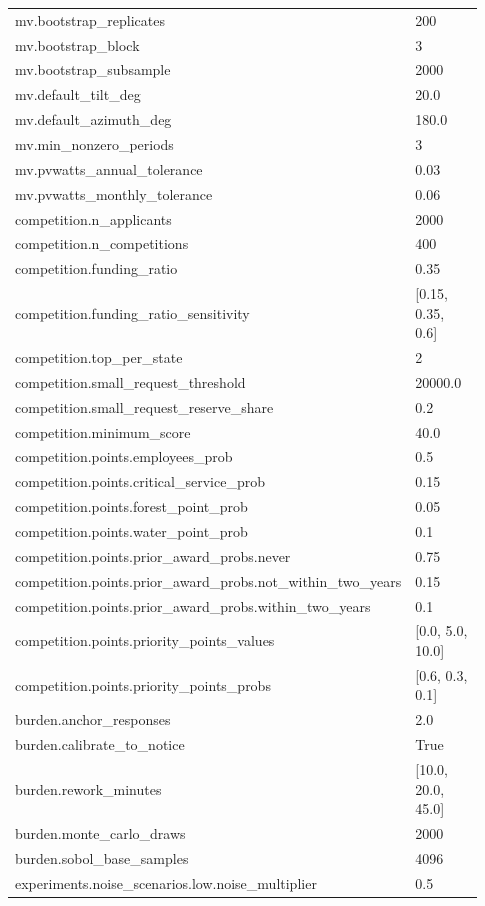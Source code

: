 \begin{longtable}{p{0.55\linewidth}p{0.38\linewidth}}
mv.bootstrap\_replicates & 200 \\
mv.bootstrap\_block & 3 \\
mv.bootstrap\_subsample & 2000 \\
mv.default\_tilt\_deg & 20.0 \\
mv.default\_azimuth\_deg & 180.0 \\
mv.min\_nonzero\_periods & 3 \\
mv.pvwatts\_annual\_tolerance & 0.03 \\
mv.pvwatts\_monthly\_tolerance & 0.06 \\
competition.n\_applicants & 2000 \\
competition.n\_competitions & 400 \\
competition.funding\_ratio & 0.35 \\
competition.funding\_ratio\_sensitivity & [0.15, 0.35, 0.6] \\
competition.top\_per\_state & 2 \\
competition.small\_request\_threshold & 20000.0 \\
competition.small\_request\_reserve\_share & 0.2 \\
competition.minimum\_score & 40.0 \\
competition.points.employees\_prob & 0.5 \\
competition.points.critical\_service\_prob & 0.15 \\
competition.points.forest\_point\_prob & 0.05 \\
competition.points.water\_point\_prob & 0.1 \\
competition.points.prior\_award\_probs.never & 0.75 \\
competition.points.prior\_award\_probs.not\_within\_two\_years & 0.15 \\
competition.points.prior\_award\_probs.within\_two\_years & 0.1 \\
competition.points.priority\_points\_values & [0.0, 5.0, 10.0] \\
competition.points.priority\_points\_probs & [0.6, 0.3, 0.1] \\
burden.anchor\_responses & 2.0 \\
burden.calibrate\_to\_notice & True \\
burden.rework\_minutes & [10.0, 20.0, 45.0] \\
burden.monte\_carlo\_draws & 2000 \\
burden.sobol\_base\_samples & 4096 \\
experiments.noise\_scenarios.low.noise\_multiplier & 0.5 \\

\end{longtable}
